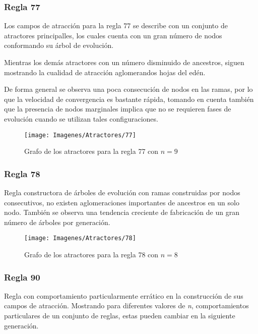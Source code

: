 \documentclass[]{article}
\begin{document}
			\newpage
			\subsubsection{Regla 77}
				\justifying
				Los campos de atracción para la regla 77 se describe con un conjunto de atractores principalles, los cuales cuenta con un gran número de nodos conformando su árbol de evolución.
				
				\hfill\break
				\justifying
				Mientras los demás atractores con un número disminuido de ancestros, siguen mostrando la cualidad de atracción aglomerandos hojas del edén.
				
				\hfill\break
				\justifying
				De forma general se observa una poca consecución de nodos en las ramas, por lo que la velocidad de convergencia es bastante rápida, tomando en cuenta también que la presencia de nodos marginales implica que no se requieren fases de evolución cuando se utilizan tales configuraciones.
				
				\hfill\break
				\hfill\break
				\begin{figure}[!h]
					\centering
					\texttt{[image: Imagenes/Atractores/77]}
					\caption{Grafo de los atractores para la regla 77 con $n=9$}
					\label{Regla_77}
				\end{figure}
			
			\newpage
			\subsubsection{Regla 78}
				\justifying
				Regla constructora de árboles de evolución con ramas construidas por nodos consecutivos, no existen aglomeraciones importantes de ancestros en un solo nodo. También se observa una tendencia creciente de fabricación de un gran número de árboles por generación.
				
				\hfill\break
				\hfill\break
				\begin{figure}[!h]
					\centering
					\texttt{[image: Imagenes/Atractores/78]}
					\caption{Grafo de los atractores para la regla 78 con $n=8$}
					\label{Regla_78}
				\end{figure}
			
			\newpage
			\subsubsection{Regla 90}
				\justifying
				Regla con comportamiento particularmente errático en la construcción de sus campos de atracción. Mostrando para diferentes valores de \textit{n}, comportamientos particulares de un conjunto de reglas, estas pueden cambiar en la siguiente generación.
				
\end{document}
